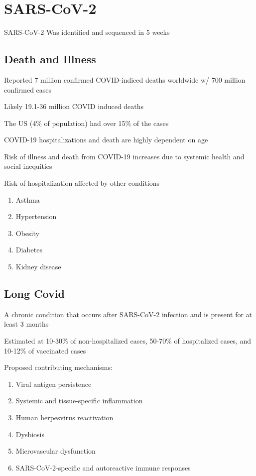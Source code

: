 \documentclass{notes}
\begin{document}
\section{SARS-CoV-2}

SARS-CoV-2 Was identified and sequenced in 5 weeks

\subsection{Death and Illness}

Reported 7 million confirmed COVID-indiced deaths worldwide w/ 700 million confirmed cases

\tab Likely 19.1-36 million COVID induced deaths

\tab The US (4\% of population) had over 15\% of the cases

COVID-19 hospitalizations and death are highly dependent on age


Risk of illness and death from COVID-19 increases due to systemic health and social inequities

Risk of hospitalization affected by other conditions

\begin{enumerate}
    \item Asthma
    \item Hypertension
    \item Obesity
    \item Diabetes
    \item Kidney disease
\end{enumerate}

\subsection{Long Covid}

A chronic condition that occurs after SARS-CoV-2 infection and is present for at least 3 months

Estimated at 10-30\% of non-hospitalized cases, 50-70\% of hospitalized cases, and 10-12\% of vaccinated cases


Proposed contributing mechanisms:

\begin{enumerate}
    \item Viral antigen persistence
    \item Systemic and tissue-specific inflammation
    \item Human herpesvirus reactivation
    \item Dysbiosis
    \item Microvascular dysfunction
    \item SARS-CoV-2-specific and autoreactive immune responses
\end{enumerate}
\end{document}
